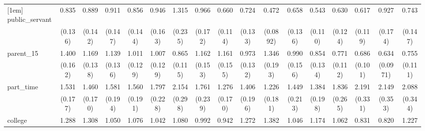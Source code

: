 {\begin{tabular}{l*{16}{c}}
[1em]
public\_servant      &       0.835         &       0.889         &       0.911         &       0.856         &       0.946         &       1.315         &       0.966         &       0.660\sym{*}  &       0.724         &       0.472\sym{***}&       0.658\sym{*}  &       0.543\sym{**} &       0.630\sym{*}  &       0.617\sym{*}  &       0.927         &       0.743         \\
                    &     (0.136)         &     (0.142)         &     (0.147)         &     (0.144)         &     (0.163)         &     (0.235)         &     (0.172)         &     (0.114)         &     (0.133)         &    (0.0892)         &     (0.136)         &     (0.110)         &     (0.124)         &     (0.119)         &     (0.174)         &     (0.147)         \\
[1em]
parent\_15           &       1.400\sym{**} &       1.169         &       1.139         &       1.011         &       1.007         &       0.865         &       1.162         &       1.161         &       0.973         &       1.346\sym{*}  &       0.990         &       0.854         &       0.771         &       0.686\sym{*}  &       0.634\sym{**} &       0.755         \\
                    &     (0.162)         &     (0.138)         &     (0.136)         &     (0.129)         &     (0.129)         &     (0.115)         &     (0.153)         &     (0.155)         &     (0.132)         &     (0.193)         &     (0.156)         &     (0.134)         &     (0.112)         &     (0.101)         &    (0.0971)         &     (0.111)         \\
[1em]
part\_time           &       1.531\sym{***}&       1.460\sym{**} &       1.581\sym{***}&       1.560\sym{***}&       1.797\sym{***}&       2.154\sym{***}&       1.761\sym{***}&       1.276         &       1.406\sym{*}  &       1.226         &       1.449\sym{*}  &       1.384\sym{*}  &       1.836\sym{***}&       2.191\sym{***}&       2.149\sym{***}&       2.088\sym{***}\\
                    &     (0.177)         &     (0.170)         &     (0.194)         &     (0.191)         &     (0.228)         &     (0.298)         &     (0.239)         &     (0.170)         &     (0.196)         &     (0.181)         &     (0.213)         &     (0.198)         &     (0.265)         &     (0.331)         &     (0.353)         &     (0.344)         \\
[1em]
college             &       1.288         &       1.308\sym{*}  &       1.050         &       1.076         &       1.042         &       1.080         &       0.992         &       0.942         &       1.272         &       1.382\sym{*}  &       1.046         &       1.174         &       1.062         &       0.831         &       0.820         &       1.227         \\

\end{tabular}}
